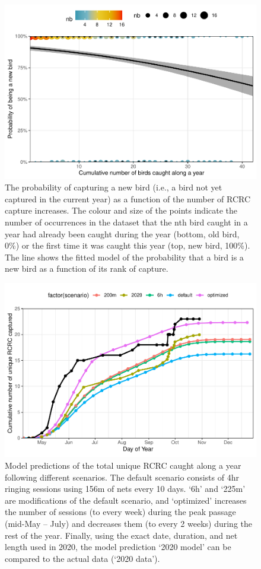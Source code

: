\documentclass[]{interact}
\theoremstyle{plain}%
\theoremstyle{definition}
\theoremstyle{remark}
\begin{document}
\begin{figure}
\centering
\includegraphics{manuscript_files/figure-latex/prob-new-bird-1.pdf}
\caption{The probability of capturing a new bird (i.e., a bird not yet
captured in the current year) as a function of the number of RCRC
capture increases. The colour and size of the points indicate the number
of occurrences in the dataset that the nth bird caught in a year had
already been caught during the year (bottom, old bird, 0\%) or the first
time it was caught this year (top, new bird, 100\%). The line shows the
fitted model of the probability that a bird is a new bird as a function
of its rank of capture.}
\end{figure}

\begin{figure}
\centering
\includegraphics{manuscript_files/figure-latex/total-rcrc-captured-1.pdf}
\caption{Model predictions of the total unique RCRC caught along a year
following different scenarios. The default scenario consists of 4hr
ringing sessions using 156m of nets every 10 days. `6h' and `225m' are
modifications of the default scenario, and `optimized' increases the
number of sessions (to every week) during the peak passage (mid-May --
July) and decreases them (to every 2 weeks) during the rest of the year.
Finally, using the exact date, duration, and net length used in 2020,
the model prediction `2020 model' can be compared to the actual data
(`2020 data').}
\end{figure}
\end{document}
